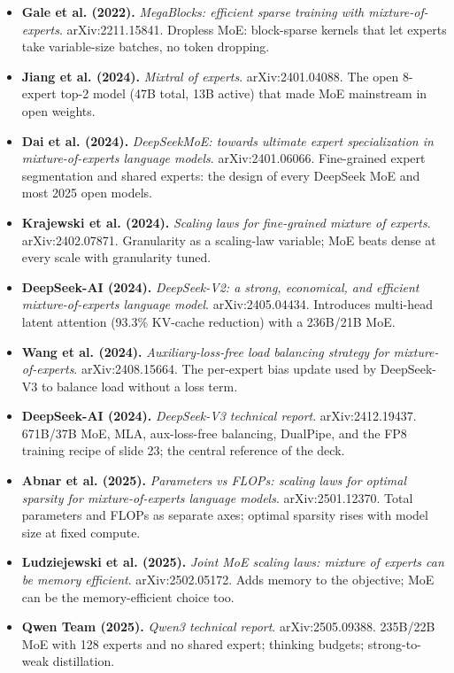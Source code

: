 \documentclass[11pt,letterpaper]{article}
\begin{document}
\begin{itemize}[leftmargin=1.2em,itemsep=3pt]
\item \textbf{Gale et al. (2022).} \textit{MegaBlocks: efficient sparse training with mixture-of-experts}. arXiv:2211.15841. Dropless MoE: block-sparse kernels that let experts take variable-size batches, no token dropping.
\item \textbf{Jiang et al. (2024).} \textit{Mixtral of experts}. arXiv:2401.04088. The open 8-expert top-2 model (47B total, 13B active) that made MoE mainstream in open weights.
\item \textbf{Dai et al. (2024).} \textit{DeepSeekMoE: towards ultimate expert specialization in mixture-of-experts language models}. arXiv:2401.06066. Fine-grained expert segmentation and shared experts: the design of every DeepSeek MoE and most 2025 open models.
\item \textbf{Krajewski et al. (2024).} \textit{Scaling laws for fine-grained mixture of experts}. arXiv:2402.07871. Granularity as a scaling-law variable; MoE beats dense at every scale with granularity tuned.
\item \textbf{DeepSeek-AI (2024).} \textit{DeepSeek-V2: a strong, economical, and efficient mixture-of-experts language model}. arXiv:2405.04434. Introduces multi-head latent attention (93.3\% KV-cache reduction) with a 236B/21B MoE.
\item \textbf{Wang et al. (2024).} \textit{Auxiliary-loss-free load balancing strategy for mixture-of-experts}. arXiv:2408.15664. The per-expert bias update used by DeepSeek-V3 to balance load without a loss term.
\item \textbf{DeepSeek-AI (2024).} \textit{DeepSeek-V3 technical report}. arXiv:2412.19437. 671B/37B MoE, MLA, aux-loss-free balancing, DualPipe, and the FP8 training recipe of slide 23; the central reference of the deck.
\item \textbf{Abnar et al. (2025).} \textit{Parameters vs FLOPs: scaling laws for optimal sparsity for mixture-of-experts language models}. arXiv:2501.12370. Total parameters and FLOPs as separate axes; optimal sparsity rises with model size at fixed compute.
\item \textbf{Ludziejewski et al. (2025).} \textit{Joint MoE scaling laws: mixture of experts can be memory efficient}. arXiv:2502.05172. Adds memory to the objective; MoE can be the memory-efficient choice too.
\item \textbf{Qwen Team (2025).} \textit{Qwen3 technical report}. arXiv:2505.09388. 235B/22B MoE with 128 experts and no shared expert; thinking budgets; strong-to-weak distillation.

\end{itemize}
\end{document}
